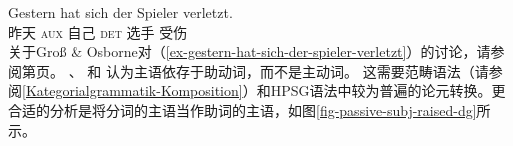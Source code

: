 {%
\ea
\label{ex-gestern-hat-sich-der-spieler-verletzt}
\gll Gestern hat sich der Spieler verletzt.\\
     昨天 \textsc{aux} 自己 \textsc{det} 选手 受伤\\
\z
关于Groß \& Osborne对（\ref{ex-gestern-hat-sich-der-spieler-verletzt}）的讨论，请参阅第\pageref{fig-gestern-hat-sich-der-spieler-verletzt-dg-rising}页。
} 
 \citet{Hudson90a-u}、 \citet[\S~5.3]{Eroms2000a}和 \citet{GO2009a}认为主语依存于助动词，而不是主动词。
%
%
%
%
这需要范畴语法（请参阅\ref{Kategorialgrammatik-Komposition}）和HPSG语法\citep{HN94a}中较为普遍的论元转换。更合适的分析是将分词的主语当作助词的主语，如图\vref{fig-passive-subj-raised-dg}所示。
